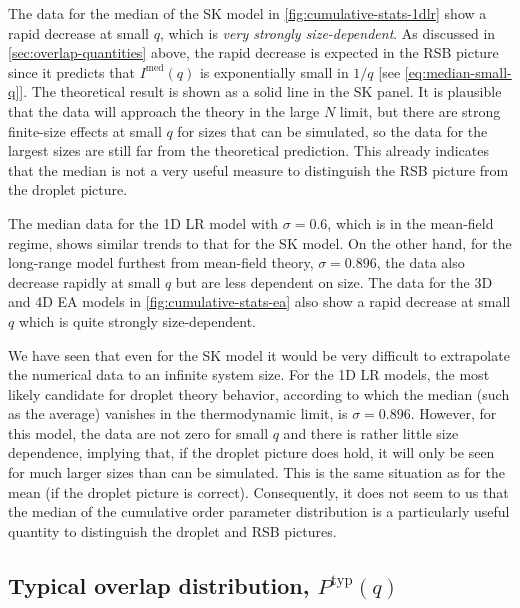 The data for the median of the SK model in \cref{fig:cumulative-stats-1dlr}
show a rapid decrease at small $q$, which is \emph{very strongly
  size-dependent}. As discussed in \cref{sec:overlap-quantities} above, the
rapid decrease is expected in the RSB picture since it predicts that
$I^{\mathrm{med}}(q)$ is exponentially small in $1/q$ [see
\cref{eq:median-small-q}]. The theoretical result is shown as a solid line in
the SK panel. It is plausible that the data will approach the theory in the
large $N$ limit, but there are strong finite-size effects at small $q$ for
sizes that can be simulated, so the data for the largest sizes are still far
from the theoretical prediction. This already indicates that the median is not
a very useful measure to distinguish the RSB picture from the droplet picture.

The median data for the 1D LR model with $\sigma=0.6$, which is in the
mean-field regime, shows similar trends to that for the SK model. On the other
hand, for the long-range model furthest from mean-field theory, $\sigma=0.896$,
the data also decrease rapidly at small $q$ but are less dependent on size. The
data for the 3D and 4D EA models in \cref{fig:cumulative-stats-ea} also show a
rapid decrease at small $q$ which is quite strongly size-dependent.

We have seen that even for the SK model it would be very difficult to
extrapolate the numerical data to an infinite system size. For the 1D LR
models, the most likely candidate for droplet theory behavior, according to
which the median (such as the average) vanishes in the thermodynamic limit, is
$\sigma=0.896$. However, for this model, the data are not zero for small $q$
and there is rather little size dependence, implying that, if the droplet
picture does hold, it will only be seen for much larger sizes than can be
simulated. This is the same situation as for the mean (if the droplet picture
is correct). Consequently, it does not seem to us that the median of the
cumulative order parameter distribution is a particularly useful quantity to
distinguish the droplet and RSB pictures.


\subsection{Typical overlap distribution, $P^{\mathrm{typ}}(q)$}
\label{sec:overlap-results-typical}

